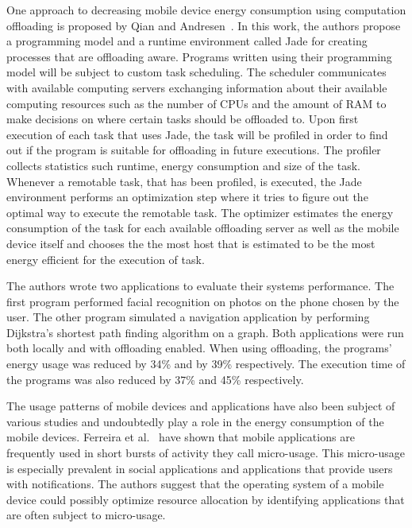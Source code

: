 One approach to decreasing mobile device energy consumption using computation offloading is proposed by Qian and Andresen~\cite{7176219}. In this work, the authors propose a programming model and a runtime environment called Jade for creating processes that are offloading aware. Programs written using their programming model will be subject to custom task scheduling. The scheduler communicates with available computing servers exchanging information about their available computing resources such as the number of CPUs and the amount of RAM to make decisions on where certain tasks should be offloaded to. Upon first execution of each task that uses Jade, the task will be profiled in order to find out if the program is suitable for offloading in future executions. The profiler collects statistics such runtime, energy consumption and size of the task. Whenever a remotable task, that has been profiled, is executed, the Jade environment performs an optimization step where it tries to figure out the optimal way to execute the remotable task. The optimizer estimates the energy consumption of the task for each available offloading server as well as the mobile device itself and chooses the the most host that is estimated to be the most energy efficient for the execution of task.

The authors wrote two applications to evaluate their systems performance. The first program performed facial recognition on photos on the phone chosen by the user. The other program simulated a navigation application by performing Dijkstra's shortest path finding algorithm on a graph. Both applications were run both locally and with offloading enabled. When using offloading, the programs' energy usage was reduced by 34\% and by 39\% respectively. The execution time of the programs was also reduced by 37\% and 45\% respectively.                 


The usage patterns of mobile devices and applications have also been subject of various studies and undoubtedly play a role in the energy consumption of the mobile devices. Ferreira et al.~\cite{Ferreira:2014:CES:2628363.2628367} have shown that mobile applications are frequently used in short bursts of activity they call micro-usage. This micro-usage is especially prevalent in social applications and applications that provide users with notifications. The authors suggest that the operating system of a mobile device could possibly optimize resource allocation by identifying applications that are often subject to micro-usage.

